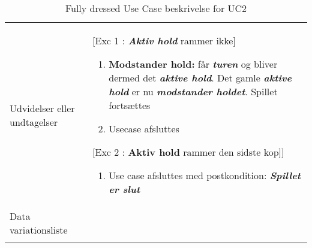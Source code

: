 \documentclass[Kravspecifikation/Kravspec_Main.tex]{subfiles}
\begin{document}
\begin{longtable}[]{@{}ll@{}}
\begin{minipage}[t]{0.47\columnwidth}
\end{minipage}\tabularnewline
\toprule
\begin{minipage}[t]{0.47\columnwidth}\raggedright
{Udvidelser eller undtagelser}\strut
\end{minipage} & \begin{minipage}[t]{0.47\columnwidth}\raggedright
[Exc 1 : \textbf{\textit{Aktiv hold}} rammer ikke] 
\begin{enumerate}
\item {\textbf{Modstander hold:} får \textbf{\textit{turen}} og bliver dermed det \textbf{\textit{aktive hold}}. Det gamle \textbf{\textit{aktive hold}} er nu \textbf{\textit{modstander holdet}}. Spillet fortsættes}
\item Usecase afsluttes
\end{enumerate}
[Exc 2 : \textbf{Aktiv hold} rammer den sidste kop]]
\begin{enumerate}
\item Use case afsluttes med postkondition: \textbf{\textit{Spillet er slut}}
\end{enumerate}\strut
\end{minipage}\tabularnewline
\toprule
\begin{minipage}[t]{0.47\columnwidth}\raggedright
{Data variationsliste}\strut
\end{minipage} & \begin{minipage}[t]{0.47\columnwidth}\raggedright
{}\strut
\end{minipage}\tabularnewline
\bottomrule
\bottomrule
\caption{Fully dressed Use Case beskrivelse for UC2}
\end{longtable}
\label{tab:UC2}
\end{document}
